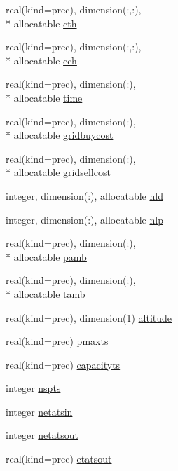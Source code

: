 \begin{DoxyCompactItemize}
\item 
real(kind=prec), dimension(\-:,\-:), \\*
allocatable \hyperlink{classinputvar_adcb3f28e49daee36d91bc87941f486c9}{cth}
\item 
real(kind=prec), dimension(\-:,\-:), \\*
allocatable \hyperlink{classinputvar_a88bb670dc0bca944104c292071818a36}{cch}
\item 
real(kind=prec), dimension(\-:), \\*
allocatable \hyperlink{classinputvar_a7d20a57b0a7dfe6c386e831f25636546}{time}
\item 
real(kind=prec), dimension(\-:), \\*
allocatable \hyperlink{classinputvar_a10f5c69ad85799dd2ae3a39500ba3005}{gridbuycost}
\item 
real(kind=prec), dimension(\-:), \\*
allocatable \hyperlink{classinputvar_a2f72c3ce64312b528c0679cbd950fb8f}{gridsellcost}
\item 
integer, dimension(\-:), allocatable \hyperlink{classinputvar_a8c5a23a5a519fb86c67fc1465aef0e33}{nld}
\item 
integer, dimension(\-:), allocatable \hyperlink{classinputvar_a3f2f71983b35bd63596385392671f89d}{nlp}
\item 
real(kind=prec), dimension(\-:), \\*
allocatable \hyperlink{classinputvar_a241f8b7a07fdc252022c2ef56cfded42}{pamb}
\item 
real(kind=prec), dimension(\-:), \\*
allocatable \hyperlink{classinputvar_a1cdc501a6b8cb511ab141219362b9aaa}{tamb}
\item 
real(kind=prec), dimension(1) \hyperlink{classinputvar_a3f078edd3f3cfd59802ac6321ad3b837}{altitude}
\item 
real(kind=prec) \hyperlink{classinputvar_a6301e249eea800b1c3052280fce007b2}{pmaxts}
\item 
real(kind=prec) \hyperlink{classinputvar_aa1efd68463d126d8971abdafa06d3a33}{capacityts}
\item 
integer \hyperlink{classinputvar_aaefd22e32dc26863fb189c2a0305ac3b}{nspts}
\item 
integer \hyperlink{classinputvar_accdc85c467baf46e33e1237e719ad174}{netatsin}
\item 
integer \hyperlink{classinputvar_ac0b8841a56f7e91ebd3c2878d4499c2b}{netatsout}
\item 
real(kind=prec) \hyperlink{classinputvar_a1855fdf34565c8a9555f350ae7958ecd}{etatsout}

\end{DoxyCompactItemize}
